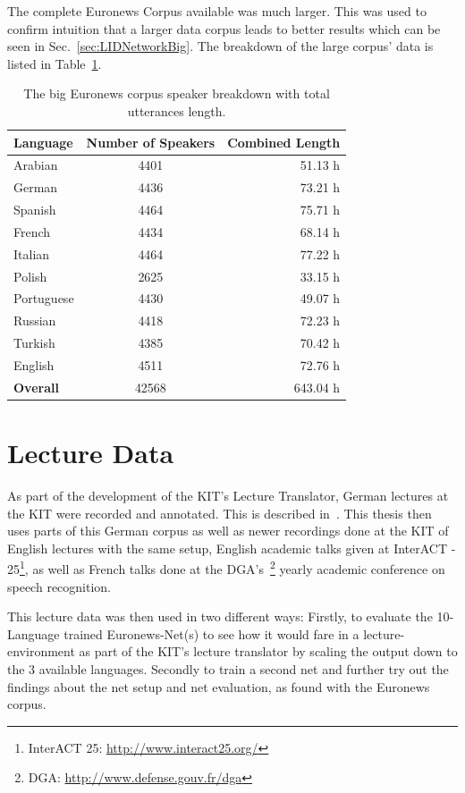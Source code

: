 The complete Euronews Corpus available was much larger. This was used to confirm intuition that a larger data corpus leads to better results which can be seen in Sec.~\ref{sec:LIDNetworkBig}. The breakdown of the large corpus' data is listed in Table~\ref{tab:spkDataBig}.

\begin{table}[h!]
\caption{The big Euronews corpus speaker breakdown with total utterances length.}
\label{tab:spkDataBig}
\centering
\begin{tabular}{| l | c | r | }
	\hline
	\textbf{Language} & \textbf{Number of Speakers} & \textbf{Combined Length} \\
	\hline
	Arabian & 4401 & 51.13 h \\
	German & 4436 & 73.21 h \\
	Spanish & 4464 & 75.71 h \\
	French & 4434 & 68.14 h \\  
	Italian & 4464 & 77.22 h \\  
	Polish & 2625 & 33.15 h \\ 
	Portuguese & 4430 & 49.07 h \\ 
	Russian & 4418 & 72.23 h \\ 
	Turkish & 4385 & 70.42 h \\  
	English & 4511 & 72.76 h \\ 
	\hline
	\textbf{Overall} & 42568 & 643.04 h\\
	\hline	
\end{tabular}
\end{table}

\newpage
\section{Lecture Data}
\label{sec:LITasks:Lecture}

As part of the development of the KIT's Lecture Translator, German lectures at the KIT were recorded and annotated. This is described in~\cite{stuker2012kit}. This thesis then uses parts of this German corpus as well as newer recordings done at the KIT of English lectures with the same setup, English academic talks given at InterACT - 25\footnote{InterACT 25: \url{http://www.interact25.org/}}, as well as French talks done at the DGA's~\footnote{DGA: \url{http://www.defense.gouv.fr/dga}} yearly academic conference on speech recognition.

This lecture data was then used in two different ways: Firstly, to evaluate the 10-Language trained Euronews-Net(s) to see how it would fare in a lecture-environment as part of the KIT's lecture translator by scaling the output down to the 3 available languages. Secondly to train a second net and further try out the findings about the net setup and net evaluation, as found with the Euronews corpus.

